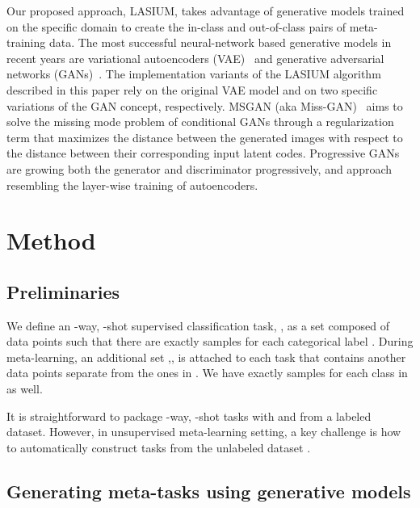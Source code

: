 \documentclass{article}
\begin{document}
Our proposed approach, LASIUM, takes advantage of generative models trained on the specific domain to create the in-class and out-of-class pairs of meta-training data. The most successful neural-network based generative models in recent years are variational autoencoders (VAE)~\cite{kingma2013auto} and generative adversarial networks (GANs)~\cite{goodfellow2014generative}. The implementation variants of the LASIUM algorithm described in this paper rely on the original VAE model and on two specific variations of the GAN concept, respectively. MSGAN (aka Miss-GAN)~\cite{mode-gan-Qi2019} aims to solve the missing mode problem of conditional GANs through a regularization term that maximizes the distance between the generated images with respect to the distance between their corresponding input latent codes. Progressive GANs~\cite{karras2017progressive}  are growing both the generator and discriminator progressively, and approach resembling the layer-wise training of autoencoders. 

 \section{Method}


\newcommand{\Task}{\mathcal{T}}
\newcommand{\TaskTrain}{\mathcal{D}_{\mathcal{T}}^{(tr)}}
\newcommand{\TaskVal}{\mathcal{D}_{\mathcal{T}}^{(val)}}



\subsection{Preliminaries}

We define an -way, -shot supervised classification task, , as a set  composed of  data points  such that there are exactly  samples for each categorical label . 
During meta-learning, an additional set ,, is attached to each task that contains another  data points separate from the ones in . We have exactly  samples for each class in  as well. 

It is straightforward to package -way, -shot tasks with  and  from  a labeled dataset.
However, in unsupervised meta-learning setting, a key challenge is how to automatically construct tasks from the unlabeled dataset . 


\subsection{Generating meta-tasks using generative models}\label{section32}
\end{document}
